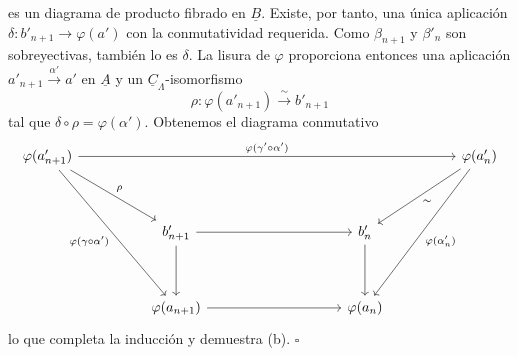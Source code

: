 
es un diagrama de producto fibrado en $\underline B$. Existe, por
tanto, una única aplicación
$\delta:b'_{n+1}\longrightarrow\varphi(a')$ con la conmutatividad
requerida. Como $\beta_{n+1}$ y $\beta'_n$ son sobreyectivas,
también lo es $\delta$. La lisura de $\varphi$ proporciona entonces
una aplicación $a'_{n+1}\xrightarrow{\alpha'}a'$ en $\underline A$
y un $\underline C_\Lambda$-isomorfismo
\[
 \rho:\varphi(a'_{n+1})\xrightarrow{\ \sim\ }b'_{n+1}
\]
tal que $\delta\circ\rho=\varphi(\alpha')$. Obtenemos el diagrama
conmutativo
\[
\begin{tikzcd}[row sep=huge,column sep=huge]
 \varphi(a'_{n+1})
   \arrow[rrrr,"{\varphi(\gamma'\circ\alpha')}"]
   \arrow[dr,"{\rho}"]
   \arrow[ddr,"{\varphi(\gamma\circ\alpha')}"']
 &&&& \varphi(a'_n)
   \arrow[dl,"{\sim}"]
   \arrow[ddl,"{\varphi(\alpha'_n)}"]\\
 & b'_{n+1} \arrow[rr] \arrow[d]
 && b'_n \arrow[d] &\\
 & \varphi(a_{n+1}) \arrow[rr]
 && \varphi(a_n) &
\end{tikzcd}
\]
lo que completa la inducción y demuestra (b). \hfill$\square$
